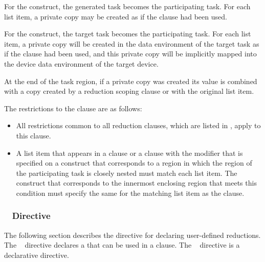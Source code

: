 For the  construct, the generated task becomes the participating
task. For each list item, a private copy may be created as if the 
clause had been used.

For the  construct, the target task becomes the participating
task. For each list item, a private copy will be created in the data
environment of the target task as if the  clause had been used,
and this private copy will be implicitly mapped into the device data
environment of the target device.

At the end of the task region, if a private copy was created its value is
combined with a copy created by a reduction scoping clause or with the original
list item.

\restrictions
The restrictions to the  clause are as follows:

\begin{itemize}
\item All restrictions common to all reduction clauses, which are listed in
      , apply to
      this clause.
\item A list item that appears in a  clause or a 
       clause with the  modifier that is specified on 
      a construct that corresponds to a region in which the region of the 
      participating task is closely nested must match each list item. The 
      construct that corresponds to the innermost enclosing region that meets
      this condition must specify the same  for the
      matching list item as the  clause.
\end{itemize}



\subsubsection{~ Directive}
\label{subsubsec:declare reduction Directive}
\summary
The following section describes the directive for declaring user-defined 
reductions. The ~ directive declares a 
 that can be used in a  clause. 
The ~ directive is a declarative directive.

